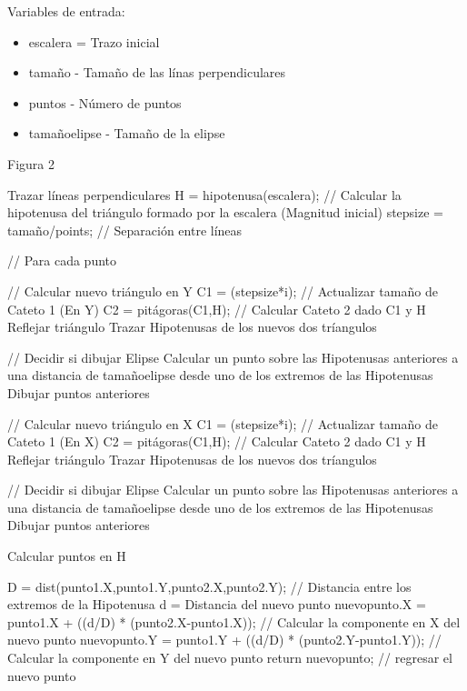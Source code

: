 \documentclass[letter,10pt]{article}
\begin{document}
 

Variables de entrada:
\begin{itemize}
	\item  escalera = Trazo inicial
	\item  tamaño - Tamaño de las línas perpendiculares
	\item  puntos - Número de puntos
	\item tamañoelipse - Tamaño de la elipse
\end{itemize}

\begin{algorithm}
	\caption{Figura 2} 
	\begin{algorithmic}[1]

		\State Trazar líneas perpendiculares
		\State H = hipotenusa(escalera); // Calcular la hipotenusa del triángulo formado por la escalera (Magnitud inicial)
		\State stepsize = tamaño/points; // Separación entre líneas

		 // Para cada punto

			\State // Calcular nuevo triángulo en Y
			\State  C1 = (stepsize*i);   // Actualizar tamaño de Cateto 1 (En Y)
			\State  C2 = pitágoras(C1,H); // Calcular Cateto 2 dado C1 y H
			\State  Reflejar triángulo
			\State 	Trazar Hipotenusas de los nuevos dos tríangulos
			
			 // Decidir si dibujar Elipse
				\State Calcular un punto sobre las Hipotenusas anteriores a una distancia de tamañoelipse desde uno de los extremos de las Hipotenusas
				\State Dibujar puntos anteriores
			\EndIf

			\State // Calcular nuevo triángulo en X
			\State  C1 = (stepsize*i);   // Actualizar tamaño de Cateto 1 (En X)
			\State  C2 = pitágoras(C1,H); // Calcular Cateto 2 dado C1 y H
			\State  Reflejar triángulo
			\State 	Trazar Hipotenusas de los nuevos dos tríangulos
			
			 // Decidir si dibujar Elipse
				\State Calcular un punto sobre las Hipotenusas anteriores a una distancia de tamañoelipse desde uno de los extremos de las Hipotenusas
				\State Dibujar puntos anteriores
			\EndIf
		\EndFor
	\end{algorithmic} 
\end{algorithm}

\begin{algorithm}
	\caption{Calcular puntos en H} 
	\begin{algorithmic}[1]
        \State D = dist(punto1.X,punto1.Y,punto2.X,punto2.Y); // Distancia entre los extremos de la Hipotenusa
        \State d = Distancia del nuevo punto
        \State nuevopunto.X = punto1.X + ((d/D) * (punto2.X-punto1.X)); // Calcular la componente en X del nuevo punto
        \State nuevopunto.Y = punto1.Y + ((d/D) * (punto2.Y-punto1.Y)); // Calcular la componente en Y del nuevo punto
        \State return nuevopunto; // regresar el nuevo punto
	\end{algorithmic} 
\end{algorithm}
\end{document}
